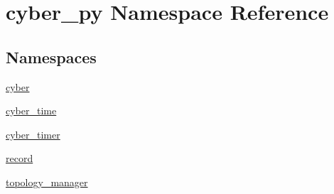\hypertarget{namespacecyber__py}{\section{cyber\-\_\-py Namespace Reference}
\label{namespacecyber__py}
}
\subsection*{Namespaces}
\begin{DoxyCompactItemize}
\item 
\hyperlink{namespacecyber__py_1_1cyber}{cyber}
\item 
\hyperlink{namespacecyber__py_1_1cyber__time}{cyber\-\_\-time}
\item 
\hyperlink{namespacecyber__py_1_1cyber__timer}{cyber\-\_\-timer}
\item 
\hyperlink{namespacecyber__py_1_1record}{record}
\item 
\hyperlink{namespacecyber__py_1_1topology__manager}{topology\-\_\-manager}
\end{DoxyCompactItemize}
